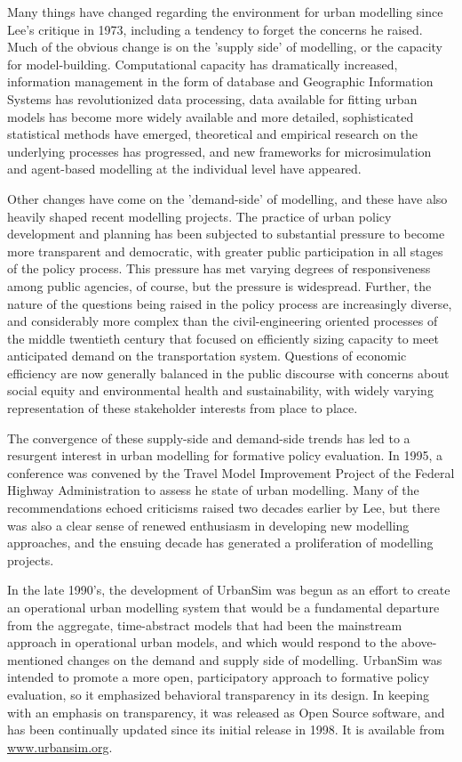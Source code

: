 Many things have changed regarding the environment for urban
modelling since Lee's critique in 1973, including a tendency to
forget the concerns he raised.  Much of the obvious change is on
the 'supply side' of modelling, or the capacity for
model-building. Computational capacity has dramatically increased,
information management in the form of database and Geographic
Information Systems has revolutionized data processing, data
available for fitting urban models has become more widely
available and more detailed, sophisticated statistical methods
have emerged, theoretical and empirical research on the underlying
processes has progressed, and new frameworks for microsimulation
and agent-based modelling at the individual level have appeared.

Other changes have come on the 'demand-side' of modelling, and
these have also heavily shaped recent modelling projects.  The
practice of urban policy development and planning has been
subjected to substantial pressure to become more transparent and
democratic, with greater public participation in all stages of the
policy process.  This pressure has met varying degrees of
responsiveness among public agencies, of course, but the pressure
is widespread.  Further, the nature of the questions being raised
in the policy process are increasingly diverse, and considerably
more complex than the civil-engineering oriented processes of the
middle twentieth century that focused on efficiently sizing
capacity to meet anticipated demand on the transportation system.
Questions of economic efficiency are now generally balanced in the
public discourse with concerns about social equity and
environmental health and sustainability, with widely varying
representation of these stakeholder interests from place to place.

The convergence of these supply-side and demand-side trends has
led to a resurgent interest in urban modelling for formative
policy evaluation. In 1995, a conference was convened by the
Travel Model Improvement Project of the Federal Highway
Administration to assess he state of urban modelling.  Many of the
recommendations echoed criticisms raised two decades earlier by
Lee, but there was also a clear sense of renewed enthusiasm in
developing new modelling approaches, and the ensuing decade has
generated a proliferation of modelling projects.

In the late 1990's, the development of UrbanSim  was begun as an
effort to create an operational urban modelling system that would
be a fundamental departure from the aggregate, time-abstract
models that had been the mainstream approach in operational urban
models, and which would respond to the above-mentioned changes on
the demand and supply side of modelling.  UrbanSim was intended to
promote a more open, participatory approach to formative policy
evaluation, so it emphasized behavioral transparency in its
design.  In keeping with an emphasis on transparency, it was
released as Open Source software, and has been continually updated
since its initial release in 1998.  It is available from
\url{www.urbansim.org}.

